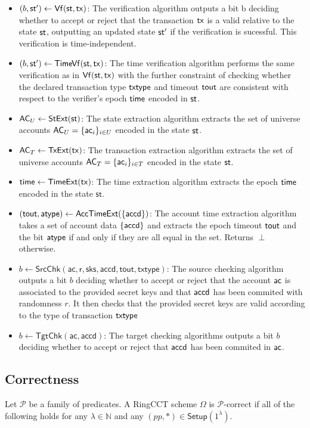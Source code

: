 \begin{definition}
\begin{itemize}
        \item $(b,\st') \gets \mathsf{Vf}(\st,\tx)$: The verification algorithm outputs a bit b deciding whether to accept or reject that the transaction $\mathsf{tx}$ is a valid relative to the state $\st$, outputting an updated state $\st'$ if the verification is sucessful. This verification is time-independent.
        \item $(b,\mathsf{st}') \gets \mathsf{TimeVf}(\st,\tx)$: The time verification algorithm performs the same verification as in $\mathsf{Vf}(\st, \tx)$ with the further constraint of checking whether the declared transaction type $\mathsf{txtype}$ and timeout $\mathsf{tout}$ are consistent with respect to the verifier's epoch $\mathsf{time}$ encoded in $\st$.
        \item $\mathsf{AC}_U \gets \mathsf{StExt}(\st)$: The state extraction algorithm
        extracts the set of universe accounts $\mathsf{AC}_U = \{\mathsf{ac}_i\}_{i \in U}$ encoded in the state $\st$.
        \item $\mathsf{AC}_T \gets \mathsf{TxExt}(\mathsf{tx})$: The transaction extraction algorithm
        extracts the set of universe accounts $\mathsf{AC}_T = \{\mathsf{ac}_i\}_{i \in T}$ encoded in the state $\st$.
        \item $\mathsf{time} \gets \mathsf{TimeExt}(\mathsf{tx})$: The time extraction algorithm
        extracts the epoch $\mathsf{time}$ encoded in the state $\mathsf{st}$.
        \item $(\mathsf{tout}, \mathsf{atype}) \gets \mathsf{AccTimeExt}(\{\mathsf{accd}\})$: The account time extraction algorithm takes a set of account data $\{\mathsf{accd}\}$ and extracts the epoch timeout $\mathsf{tout}$ and the bit $\mathsf{atype}$ if and only if they are all equal in the set. Returns $\perp$ otherwise.
        \item $b \gets \mathsf{SrcChk}(\mathsf{ac,r,sks,accd,tout,txtype})$: The source checking algorithm outputs a bit $b$ deciding whether to accept or reject that the account $\mathsf{ac}$ is associated to the provided secret keys and that $\mathsf{accd}$ has been commited with randomness $r$. It then checks that the provided secret keys are valid according to the type of transaction $\mathsf{txtype}$
        \item $b \gets \mathsf{TgtChk}(\mathsf{ac,accd})$: The target checking algorithms outputs a bit $b$ deciding whether to accept or reject that $\mathsf{accd}$ has been commited in $\mathsf{ac}$. 
    \end{itemize}
\end{definition}

\subsection{Correctness}
\begin{definition}[Correctness] 
    Let $\mathcal{P}$ be a family of predicates. A RingCCT scheme $\Omega$ is $\mathcal{P}$-correct if all of the following holds for any $\lambda \in \mathbb{N}$ and any $(pp, *) \in \mathsf{Setup}(1^\lambda)$.
\end{definition}

